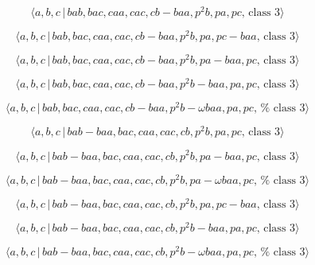 \documentclass[10pt]{article}
\begin{document}
\begin{equation}
\langle a,b,c\,|\,bab,bac,caa,cac,cb-baa,p^2b,pa,pc,\,\text{class }3\rangle 
\tag{7.2781}
\end{equation}

\begin{equation}
\langle a,b,c\,|\,bab,bac,caa,cac,cb-baa,p^2b,pa,pc-baa,\,\text{class }%
3\rangle  \tag{7.2782}
\end{equation}

\begin{equation}
\langle a,b,c\,|\,bab,bac,caa,cac,cb-baa,p^2b,pa-baa,pc,\,\text{class }%
3\rangle  \tag{7.2783}
\end{equation}

\begin{equation}
\langle a,b,c\,|\,bab,bac,caa,cac,cb-baa,p^2b-baa,pa,pc,\,\text{class }%
3\rangle  \tag{7.2784}
\end{equation}

\begin{equation}
\langle a,b,c\,|\,bab,bac,caa,cac,cb-baa,p^{2}b-\omega baa,pa,pc,\,\text{%
class }3\rangle  \tag{7.2785}
\end{equation}

\begin{equation}
\langle a,b,c\,|\,bab-baa,bac,caa,cac,cb,p^2b,pa,pc,\,\text{class }3\rangle 
\tag{7.2786}
\end{equation}

\begin{equation}
\langle a,b,c\,|\,bab-baa,bac,caa,cac,cb,p^2b,pa-baa,pc,\,\text{class }%
3\rangle  \tag{7.2787}
\end{equation}

\begin{equation}
\langle a,b,c\,|\,bab-baa,bac,caa,cac,cb,p^{2}b,pa-\omega baa,pc,\,\text{%
class }3\rangle  \tag{7.2788}
\end{equation}

\begin{equation}
\langle a,b,c\,|\,bab-baa,bac,caa,cac,cb,p^2b,pa,pc-baa,\,\text{class }%
3\rangle  \tag{7.2789}
\end{equation}

\begin{equation}
\langle a,b,c\,|\,bab-baa,bac,caa,cac,cb,p^2b-baa,pa,pc,\,\text{class }%
3\rangle  \tag{7.2790}
\end{equation}

\begin{equation}
\langle a,b,c\,|\,bab-baa,bac,caa,cac,cb,p^{2}b-\omega baa,pa,pc,\,\text{%
class }3\rangle  \tag{7.2791}
\end{equation}
\end{document}
